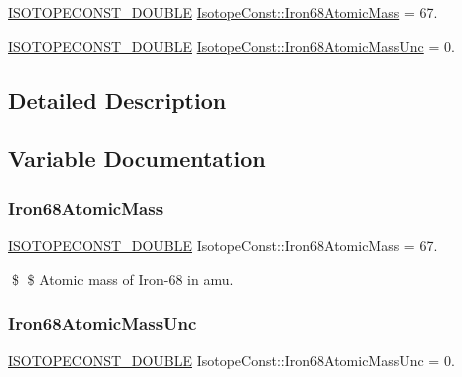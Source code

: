 \begin{DoxyCompactItemize}
\item 
\mbox{\hyperlink{group___isotope_const-_macros_ga8f45a7272ce02c0b4c65c44636ed719a}{I\+S\+O\+T\+O\+P\+E\+C\+O\+N\+S\+T\+\_\+\+D\+O\+U\+B\+LE}} \mbox{\hyperlink{group___isotope_const-_iron-_fe68_gad189052701ed418f6a32e50513ca7e28}{Isotope\+Const\+::\+Iron68\+Atomic\+Mass}} = 67.
\item 
\mbox{\hyperlink{group___isotope_const-_macros_ga8f45a7272ce02c0b4c65c44636ed719a}{I\+S\+O\+T\+O\+P\+E\+C\+O\+N\+S\+T\+\_\+\+D\+O\+U\+B\+LE}} \mbox{\hyperlink{group___isotope_const-_iron-_fe68_ga02ce51f36fe8a4d16ed68a7644da9f61}{Isotope\+Const\+::\+Iron68\+Atomic\+Mass\+Unc}} = 0.
\end{DoxyCompactItemize}


\subsection{Detailed Description}


\subsection{Variable Documentation}
\mbox{\label{group___isotope_const-_iron-_fe68_gad189052701ed418f6a32e50513ca7e28}} 
\subsubsection{\texorpdfstring{Iron68\+Atomic\+Mass}{Iron68AtomicMass}}
{\footnotesize\ttfamily \mbox{\hyperlink{group___isotope_const-_macros_ga8f45a7272ce02c0b4c65c44636ed719a}{I\+S\+O\+T\+O\+P\+E\+C\+O\+N\+S\+T\+\_\+\+D\+O\+U\+B\+LE}} Isotope\+Const\+::\+Iron68\+Atomic\+Mass = 67.}

\$ \$ Atomic mass of Iron-\/68 in amu. \mbox{\label{group___isotope_const-_iron-_fe68_ga02ce51f36fe8a4d16ed68a7644da9f61}} 
\subsubsection{\texorpdfstring{Iron68\+Atomic\+Mass\+Unc}{Iron68AtomicMassUnc}}
{\footnotesize\ttfamily \mbox{\hyperlink{group___isotope_const-_macros_ga8f45a7272ce02c0b4c65c44636ed719a}{I\+S\+O\+T\+O\+P\+E\+C\+O\+N\+S\+T\+\_\+\+D\+O\+U\+B\+LE}} Isotope\+Const\+::\+Iron68\+Atomic\+Mass\+Unc = 0.}

